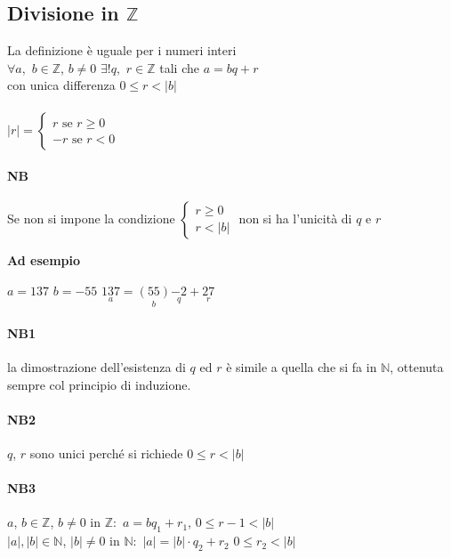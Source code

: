     \subsection{Divisione in $\mathbb{Z}$}
    La definizione è uguale per i numeri interi \\
    $\forall a,$ $ b\in\mathbb{Z}$, $b\neq0$   $\exists!q,$ $r\in\mathbb{Z}$ tali che $a=bq+r$\\
    con unica differenza $0\leq r<|b|$\\\\
    $|r|=
    \begin{cases}
        r \textrm{ se } r\geq 0\\
        -r \textrm{ se } r < 0
    \end{cases}
    $
    \paragraph{NB} Se non si impone la condizione 
    $
    \begin{cases}
        r\geq 0\\
        r < |b| 
    \end{cases}
    $
    non si ha l'unicità di $q$ e $r$ 

    \textbf{Ad esempio}

    $a=137$ $b=-55$\hspace{1cm} $\underset{a}{137}=\underset{b}{(55)}
    \underset{q}{-2}
    +\underset{r}{27}$ 
    \paragraph{NB1}la dimostrazione dell'esistenza di $q$ ed $r$ è simile a quella che si fa in $\mathbb{N}$, ottenuta sempre
    col principio di induzione.
    \color{red}
    \paragraph{NB2} $q$, $r$ sono unici perché si richiede $0\leq r < |b|$ \color{black}
    \paragraph{NB3} $a$, $b\in\mathbb{Z}$, $b\neq 0$ in $\mathbb{Z}:$ $a=bq_1+r_1$, $0\leq r-1<|b|$\\
    $|a|,|b|\in\mathbb{N}$, $|b|\neq 0$ in $\mathbb{N}:$ $|a|=|b|\cdot q_2+r_2$ $0\leq r_2 <
    |b|$\\
